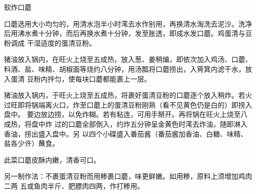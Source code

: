 \begin{recipe}{软炸口蘑}

\ingredients


\preparation

\step 口蘑选用大小均匀的，用清水泡半小时滗去水作别用，再换清水淘洗去泥沙。洗净
后用沸水煮十分钟，而后再换水煮十分钟，发至胀透，即成水发口蘑。鸡蛋清与豆粉调成
干湿适度的蛋清豆粉。

\step 猪油放入锅内，在旺火上烧至五成热，放入葱、姜稍煸，即依次加入鸡汤、口蘑、
料酒、盐、味精、胡椒面等烧约八分钟，用汤瓢将口蘑捞出，入筲箕内滤干水，放入蛋清
豆粉内拌匀，使每块口蘑都能裹上一层。

\step 猪油放入锅内，于旺火上烧至五成热，将裹好蛋清豆粉的口蘑逐个放入稍炸。若火
过旺即将锅端离火口，炸至口蘑上的蛋清豆粉刚熟（看不见黄色仍是白的）即捞入盘中。
要边放边捞，以免炸糊。若有粘连，可用手掰开。再将锅在旺火上烧至八成热，将盘中炸
过的口蘑全部倒入，约炸五分钟呈金黄色时滗去炸油，随即淋入香油，捞出盛入盘中。另
以四个小碟盛入番茄酱（番茄酱加香油、白糖、味精、盐各少许）蘸食。

\features

此菜口蘑皮酥内嫩，清香可口。

另一制作法：不裹蛋清豆粉而用糁裹口蘑，味更鲜嫩。如用糁，原料上须增加鸡肉二两
五或鱼肉半斤、肥膘肉四两，作打糁用。

\end{recipe}

